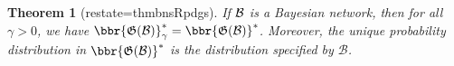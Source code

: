 \documentclass{article}
\theoremstyle{plain}
\newtheorem{theorem}{Theorem}[section]
\theoremstyle{definition}
\theoremstyle{remark}
\newcommand{\commentout}[1]{\ignorespaces}
\newcommand{\dg}[1]{\mathfrak{#1}}
\newcommand{\PDGof}[1]{\dg G(#1)}
\numberwithin{equation}{section}
\begin{document}
	
	\begin{theorem}[restate=thmbnsRpdgs]\label{thm:bns-are-pdgs}
          If $\cal B$ is a Bayesian network, then
for all $\gamma > 0$,
we have $\bbr{\PDGof{{\mathcal B}}}_\gamma^* =
\bbr{\PDGof{{\mathcal B}}}^*$.  Moreover, the unique probability distribution in
$\bbr{\PDGof{{\mathcal B}}}^*$ is the distribution specified by
            ${\mathcal B}$.
	\end{theorem}

        \commentout{        
 Theorem~\ref{thm:bns-are-pdgs} tells us that we can recover BNs, and
all the independencies that they encode, within the farmework of PDGs,
while not giving up on all the advanatages of PDGs, such as their
modularity and the ability to encode inconsistent information.
}
\end{document}
